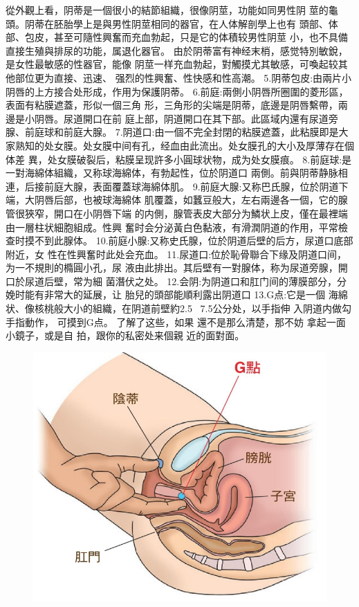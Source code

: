 \documentclass[12pt,UTF8]{ctexbook}
\begin{document}
從外觀上看，阴蒂是一個很小的結節組織，很像阴莖，功能如同男性阴
莖的龜頭。阴蒂在胚胎學上是與男性阴莖相同的器官，在人体解剖學上也有
頭部、体部、包皮，甚至可隨性興奮而充血勃起，只是它的体積较男性阴莖
小，也不具備直接生殖與排尿的功能，属退化器官。
由於阴蒂富有神经末梢，感觉特別敏銳，是女性最敏感的性器官，能像
阴莖一样充血勃起，對觸摸尤其敏感，可喚起较其他部位更为直接、迅速、
强烈的性興奮、性快感和性高潮。
5.阴蒂包皮:由兩片小阴唇的上方接合处形成，作用为保護阴蒂。
6.前庭:兩側小阴唇所圈圍的菱形區，表面有粘膜遮蓋，形似一個三角
形，三角形的尖端是阴蒂，底邊是阴唇繫帶，兩邊是小阴唇。尿道開口在前
庭上部，阴道開口在其下部。此區域内還有尿道旁腺、前庭球和前庭大腺。
7.阴道口:由一個不完全封閉的粘膜遮蓋，此粘膜即是大家熟知的处女膜。处女膜中间有孔，经血由此流出。处女膜孔的大小及厚薄存在個体差
異，处女膜破裂后，粘膜呈现許多小圓球状物，成为处女膜痕。
8.前庭球:是一對海綿体組織，又称球海綿体，有勃起性，位於阴道口
兩側。前與阴蒂静脉相連，后接前庭大腺，表面覆蓋球海綿体肌。
9.前庭大腺:又称巴氏腺，位於阴道下端，大阴唇后部，也被球海綿体
肌覆蓋，如蠶豆般大，左右兩邊各一個，它的腺管很狹窄，開口在小阴唇下端
的内側，腺管表皮大部分为鱗状上皮，僅在最裡端由一層柱状細胞組成。性興
奮时会分泌黃白色黏液，有滑潤阴道的作用，平常檢查时摸不到此腺体。
10.前庭小腺:又称史氏腺，位於阴道后壁的后方，尿道口底部附近，女
性在性興奮时此处会充血。
11.尿道口:位於恥骨聯合下缘及阴道口间，为一不規則的橢圓小孔，尿
液由此排出。其后壁有一對腺体，称为尿道旁腺，開口於尿道后壁，常为細
菌潛伏之处。
12.会阴:为阴道口和肛门间的薄膜部分，分娩时能有非常大的延展，让
胎兒的頭部能順利露出阴道口
13.G点:它是一個
海綿状、像核桃般大小的組織，在阴道前壁約2.5
~7.5公分处，以手指伸
入阴道内做勾手指動作，
可摸到G点。
了解了这些，如果
還不是那么清楚，那不妨
拿起一面小鏡子，或是自
拍，跟你的私密处来個親
近的面對面。

\begin{figure}[htbp]
	\centering
	\includegraphics[width=0.7\linewidth]{8}
	\caption{}
	\label{fig:1}
\end{figure}
\end{document}
